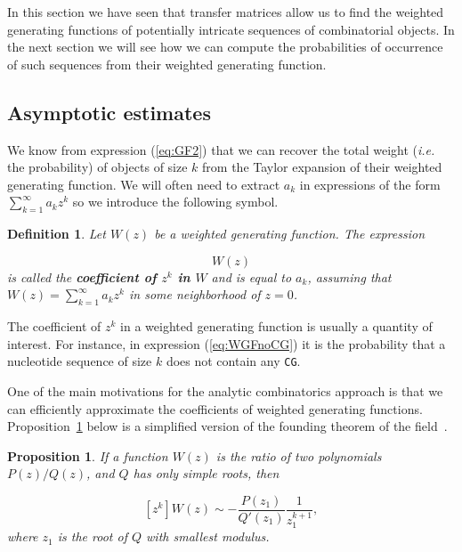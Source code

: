 \documentclass{article}
\newtheorem{definition}{Definition}
\newtheorem{proposition}{Proposition}
\begin{document}
In this section we have seen that transfer matrices allow us to find the
weighted generating functions of potentially intricate sequences of
combinatorial objects. In the next section we will see how we can compute
the probabilities of occurrence of such sequences from their weighted
generating function.





\subsection{Asymptotic estimates}
\label{sec:asest}

We know from expression (\ref{eq:GF2}) that we can recover the total
weight (\textit{i.e.} the probability) of objects of size $k$ from the
Taylor expansion of their weighted generating function. We will often need
to extract $a_k$ in expressions of the form $\sum_{k=1}^\infty a_k z^k$ so
we introduce the following symbol.

\begin{definition}
Let $W(z)$ be a weighted generating function. The expression

\begin{equation*}
[z^k]W(z)
\end{equation*}
is called the \textbf{coefficient of $z^k$ in $W$} and is equal to $a_k$,
assuming that $W(z) = \sum_{k=1}^\infty a_k z^k$ in some neighborhood of
$z = 0$.
\end{definition}

The coefficient of $z^k$ in a weighted generating function is usually a
quantity of interest. For instance, in expression (\ref{eq:WGFnoCG}) it
is the probability that a nucleotide sequence of size $k$ does not contain
any \texttt{CG}.

One of the main motivations for the analytic combinatorics approach is
that we can efficiently approximate the coefficients of weighted
generating functions. Proposition~\ref{th:ass} below is a simplified
version of the founding theorem of the
field~\cite{flajolet1990singularity}.


\begin{proposition}
\label{th:ass}
If a function $W(z)$ is the ratio of two polynomials $P(z)/Q(z)$, and $Q$
has only simple roots, then

\begin{equation}
\label{eq:ass}
[z^k]W(z) \sim
-\frac{P(z_1)}{Q'(z_1)}\frac{1}{z_1^{k+1}},
\end{equation}
where $z_1$ is the root of $Q$ with smallest \textit{modulus}.
\end{proposition}
\end{document}
